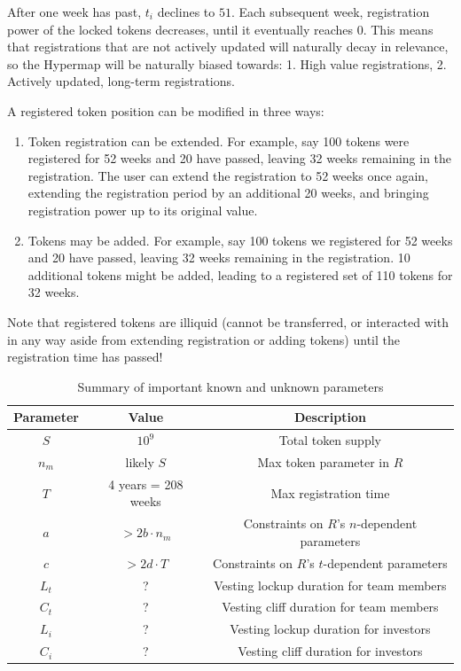 \documentclass{article}
\begin{document}
After one week has past, $t_i$ declines to $51$.
Each subsequent week, registration power of the locked tokens decreases, until it eventually reaches $0$.
This means that registrations that are not actively updated will naturally decay in relevance, so the Hypermap will be naturally biased towards:
1. High value registrations,
2. Actively updated, long-term registrations.

A registered token position can be modified in three ways:
\begin{enumerate}
    \item Token registration can be extended.
       For example, say 100 tokens were registered for 52 weeks and 20 have passed, leaving 32 weeks remaining in the registration.
       The user can extend the registration to 52 weeks once again, extending the registration period by an additional 20 weeks, and bringing registration power up to its original value.
    \item Tokens may be added.
       For example, say 100 tokens we registered for 52 weeks and 20 have passed, leaving 32 weeks remaining in the registration.
       10 additional tokens might be added, leading to a registered set of 110 tokens for 32 weeks.
\end{enumerate}

Note that registered tokens are illiquid (cannot be transferred, or interacted with in any way aside from extending registration or adding tokens) until the registration time has passed!

\begin{table}[htbp]
    \centering
    \caption{Summary of important known and unknown parameters}
    \label{tab:student-performance}
    \begin{tabular}{|c|c|c|}
    \hline
    \textbf{Parameter} & \textbf{Value} & \textbf{Description} \\
    \hline
    $S$ & $10^9$ & Total token supply \\
    $n_m$ & likely $S$ & Max token parameter in $R$ \\
    $T$ & 4 years = 208 weeks & Max registration time \\
    $a$ & $> 2b \cdot n_m$ & Constraints on $R$'s $n$-dependent parameters \\
    $c$ & $> 2d \cdot T$ & Constraints on $R$'s $t$-dependent parameters \\
    $L_t$ & ? & Vesting lockup duration for team members \\
    $C_t$ & ? & Vesting cliff duration for team members \\
    $L_i$ & ? & Vesting lockup duration for investors \\
    $C_i$ & ? & Vesting cliff duration for investors \\
    \hline
	\end{tabular}
\end{table}
\end{document}
